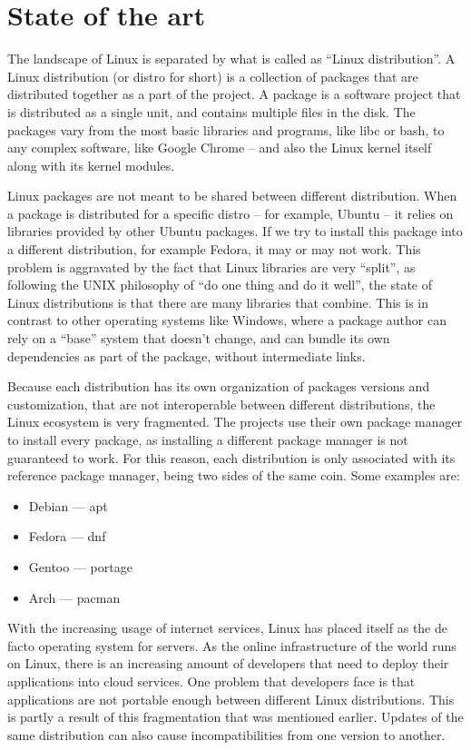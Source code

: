 \chapter{State of the art}

The landscape of Linux is separated by what is called as
``Linux distribution''. A Linux distribution (or distro for
short) is a collection of packages that are distributed
together as a part of the project. A package is a software
project that is distributed as a single unit, and contains
multiple files in the disk. The packages vary from the most
basic libraries and programs, like libc or bash, to any
complex software, like Google Chrome -- and also the Linux
kernel itself along with its kernel modules.

Linux packages are not meant to be shared between different
distribution. When a package is distributed for a specific
distro -- for example, Ubuntu -- it relies on libraries
provided by other Ubuntu packages. If we try to install this
package into a different distribution, for example Fedora,
it may or may not work. This problem is aggravated by the
fact that Linux libraries are very ``split'', as following
the UNIX philosophy of ``do one thing and do it well'', the
state of Linux distributions is that there are many
libraries that combine. This is in contrast to
other operating systems like Windows, where a package author
can rely on a ``base'' system that doesn't change, and can
bundle its own dependencies as part of the package, without
intermediate links.

Because each distribution has its own organization of
packages versions and customization, that are not
interoperable between different distributions, the Linux
ecosystem is very fragmented. The projects use their own
package manager to install every package, as installing a
different package manager is not guaranteed to work. For
this reason, each distribution is only associated with its
reference package manager, being two sides of the same coin.
Some examples are:

\begin{itemize}
    \item Debian --- apt
    \item Fedora --- dnf
    \item Gentoo --- portage
    \item Arch --- pacman
\end{itemize}

With the increasing usage of internet services, Linux has
placed itself as the de facto operating system for servers.
As the online infrastructure of the world runs on Linux,
there is an increasing amount of developers that need to
deploy their applications into cloud services. One problem
that developers face is that applications are not portable
enough between different Linux distributions. This is partly
a result of this fragmentation that was mentioned earlier.
Updates of the same distribution can also cause
incompatibilities from one version to another.


